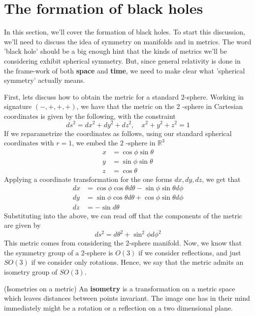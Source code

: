 \section{The formation of black holes} 
In this section, we'll cover the formation of black holes. 
To start this discussion, we'll need to discuss 
the idea of symmetry on manifolds and in metrics. 
The word 'black hole' should be a big enough hint 
that the kinds of metrics we'll be considering exhibit 
spherical symmetry. But, since general relativity is done
in the frame-work of both \textbf{space} and  \textbf{time}, 
we need to make clear what 'spherical symmetry' actually means. 

First, lets discuss how to obtain the metric for a standard $2 $-sphere. 
Working in signature $\left(  - , + , + , +  \right)  $, 
we have that the metric on the $ 2$ -sphere in Cartesian 
coordinates is given by the following, with the constraint
\[
 ds ^ 2  = dx ^ 2 + dy ^ 2 + dz ^ 2, \quad x ^ 2 + y ^ 2 + z ^ 2  = 1
\] If we reparametrize the coordinates as follows, using 
our standard spherical coordinates with $ r = 1 $, 
we embed the $2 $ -sphere in $ \mathbb{ R } ^ 3 $
\begin{align*}
	x &=  \cos \phi \sin \theta  \\ 
	y &=  \sin \phi \sin \theta  \\ 
	z &=   \cos \theta
\end{align*}
Applying a coordinate transformation for the one forms $ dx, dy, d z$, 
we get that
\begin{align*}
	dx &=  \cos \phi \cos \theta d \theta  - \sin \phi \sin \theta d \phi  \\
	dy &=  \sin \phi \cos \theta d \theta + \cos \phi \sin \theta d \phi  \\
	dz &=   - \sin d \theta  
\end{align*} 
Substituting into the above, we can read off that 
the components of the metric are given by 
\[
 d s ^ 2 =  d \theta ^ 2 + \sin ^ 2 \phi d \phi ^ 2 
\] This 
metric comes from considering the 2-sphere manifold. 
Now, we know that the symmetry group of a 2-sphere is 
$ O( 3 ) $ if we consider reflections, and just $ SO ( 3 ) $ 
if we consider only rotations. Hence, we 
say that the metric admits an isometry group of $ SO ( 3 ) $. 

\begin{defn}{(Isometries on a metric)}
	An  \textbf{isometry} is a transformation 
	on a metric space which leaves 
	distances between points invariant. 
	The image one has in their mind immediately 
	might be a rotation or a reflection on a two dimensional 
	plane. 

\end{defn}
